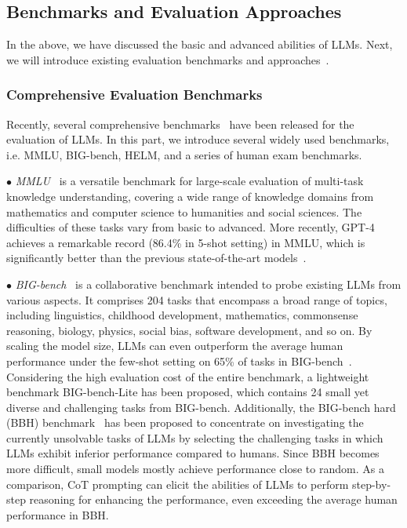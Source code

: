 {{{\subsection{Benchmarks and Evaluation Approaches} In the above, we have discussed the basic and advanced abilities of LLMs. Next, we will introduce existing evaluation benchmarks and approaches~\cite{Chang-2023-arxiv-A,Zhuang-2023-arxiv-Through}.

\subsubsection{Comprehensive Evaluation Benchmarks} Recently, several comprehensive benchmarks~\cite{Hendrycks-ICLR-2021-Measuring,Srivastava-arxiv-2022-Beyond,Liang-arxiv-2022-Holistic} have been released for the evaluation of LLMs. In this part, we introduce several widely used benchmarks, i.e. MMLU, BIG-bench, HELM, and a series of human exam benchmarks.

$\bullet$ \emph{MMLU}~\cite{Hendrycks-ICLR-2021-Measuring} is a versatile benchmark for large-scale evaluation of multi-task knowledge understanding, covering a wide range of knowledge domains {from mathematics and computer science to humanities and social sciences. The difficulties of these tasks vary from basic to advanced.} {More recently, GPT-4 achieves a remarkable record (86.4\% in 5-shot setting) in MMLU, which is significantly  better than the previous state-of-the-art models~\cite{OpenAI-OpenAI-2023-GPT-4}.}}

$\bullet$ \emph{BIG-bench}~\cite{Srivastava-arxiv-2022-Beyond} is a collaborative benchmark intended to probe existing LLMs from various aspects. {It comprises 204 tasks that encompass a broad range of topics, including linguistics, childhood development, mathematics, commonsense reasoning, biology, physics, social bias, software development, and so on.} {By scaling  the model size, LLMs can even outperform the average human performance under the few-shot setting on 65\% of tasks in BIG-bench~\cite{Chowdhery-arxiv-2022-PaLM}.} {Considering the high evaluation cost of the entire benchmark,  a lightweight benchmark BIG-bench-Lite has been proposed, which contains  24 small yet diverse and challenging tasks from BIG-bench.} Additionally, the BIG-bench hard (BBH) benchmark~\cite{Suzgun-arxiv-2022-Challenging} has been proposed to concentrate on investigating the currently unsolvable tasks of LLMs by selecting the challenging tasks in which LLMs exhibit inferior performance compared to humans. Since BBH becomes more difficult, small models mostly achieve performance close to random. {As a comparison, CoT prompting can elicit the abilities of LLMs to perform step-by-step reasoning for enhancing the performance, even exceeding the average human performance in BBH.}

}}

